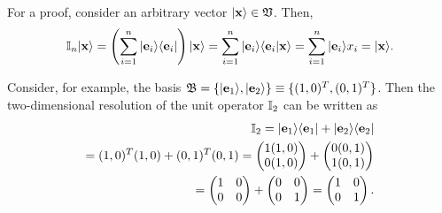 {\color{OliveGreen}
\bproof

For a proof, consider an arbitrary vector $\vert {\bf x} \rangle  \in {\frak V}$.
Then,
\begin{equation}
 {\Bbb I}_n \vert {\bf x} \rangle
 =
\left(\sum_{i=1}^n \vert {\bf e}_i \rangle \langle {\bf e}_i \vert \right)
\vert {\bf x} \rangle
=
\sum_{i=1}^n \vert {\bf e}_i \rangle \langle {\bf e}_i \vert {\bf x} \rangle
=
\sum_{i=1}^n \vert {\bf e}_i \rangle  x_i
=  \vert {\bf x} \rangle
.
\end{equation}
\eproof
}


{\color{blue}
\bexample
Consider, for example, the basis
${\frak B}=\{ \vert {\bf e}_1 \rangle , \vert {\bf e}_2 \rangle \} \equiv \{(1,0)^T,(0,1)^T\}$.
Then the two-dimensional resolution of the unit operator ${\Bbb I}_2$
can be written as
\begin{equation}
\begin{split}
{\Bbb I}_2 =   \vert {\bf e}_1 \rangle \langle  {\bf e}_1 \vert   +     \vert {\bf e}_2 \rangle  \langle  {\bf e}_2 \vert \\
=   (1,0)^T (1,0) +   (0,1)^T (0,1)
=
\begin{pmatrix}
1 (1,0) \\  0 (1,0)
\end{pmatrix}
 +
\begin{pmatrix}
0 (0,1)\\
1 (0,1)
\end{pmatrix} \\
 =
\begin{pmatrix}
1 & 0 \\
0 & 0
\end{pmatrix}
+
\begin{pmatrix}
0 & 0 \\
0 & 1
\end{pmatrix}
=
\begin{pmatrix}
1 & 0 \\
0 & 1
\end{pmatrix}
.
\end{split}
\end{equation}

}
